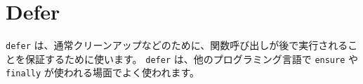 \section{Defer}

\texttt{defer} は、通常クリーンアップなどのために、関数呼び出しが後で実行されることを保証するために使います。 \texttt{defer} は、他のプログラミング言語で \texttt{ensure} や \texttt{finally} が使われる場面でよく使われます。




